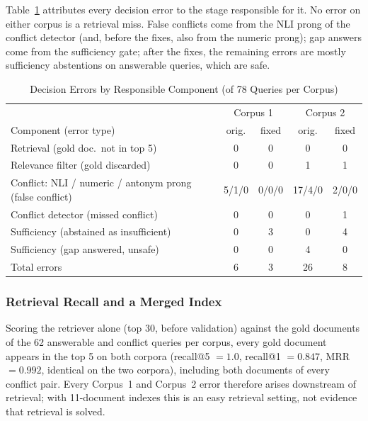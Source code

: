 \documentclass[conference]{IEEEtran}
\begin{document}
Table~\ref{tab:errors_component} attributes every decision error to the
stage responsible for it. No error on either corpus is a retrieval miss.
False conflicts come from the NLI prong of the conflict detector (and,
before the fixes, also from the numeric prong); gap answers come from the
sufficiency gate; after the fixes, the remaining errors are mostly
sufficiency abstentions on answerable queries, which are safe.

\begin{table}[htbp]
\caption{Decision Errors by Responsible Component (of 78 Queries per Corpus)}
\label{tab:errors_component}
\centering
\scriptsize
\setlength{\tabcolsep}{3pt}
\begin{tabularx}{\columnwidth}{@{}X c c c c@{}}
\toprule
 & \multicolumn{2}{c}{Corpus 1} & \multicolumn{2}{c}{Corpus 2} \\
Component (error type) & orig. & fixed & orig. & fixed \\
\midrule
Retrieval (gold doc.\ not in top 5)        & 0 & 0 & 0 & 0 \\
Relevance filter (gold discarded)          & 0 & 0 & 1 & 1 \\
Conflict: NLI / numeric / antonym prong (false conflict) & 5/1/0 & 0/0/0 & 17/4/0 & 2/0/0 \\
Conflict detector (missed conflict)        & 0 & 0 & 0 & 1 \\
Sufficiency (abstained as insufficient)    & 0 & 3 & 0 & 4 \\
Sufficiency (gap answered, unsafe)         & 0 & 0 & 4 & 0 \\
\midrule
Total errors                               & 6 & 3 & 26 & 8 \\
\bottomrule
\end{tabularx}
\end{table}

\subsubsection{Retrieval Recall and a Merged Index}
\label{sec:retrieval_recall}

Scoring the retriever alone (top 30, before validation) against the gold
documents of the 62 answerable and conflict queries per corpus, every gold
document appears in the top 5 on both corpora (recall@5 $=1.0$,
recall@1 $=0.847$, MRR $=0.992$, identical on the two corpora), including
both documents of every conflict pair. Every Corpus~1 and Corpus~2 error
therefore arises downstream of retrieval; with 11-document indexes this is
an easy retrieval setting, not evidence that retrieval is solved.
\end{document}
